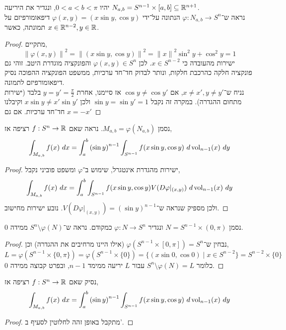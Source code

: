 \question{}
\subquestion{}
יהיו $0 < a < b < \pi$,
ונגדיר את היריעה $N_{a, b} = S^{n - 1} \times [a, b] \subseteq \mathbb{R}^{n + 1}$. \\
נראה ש־$\varphi : N_{a, b} \to S^n$ הנתונה על־ידי $\varphi(x, y) = (x \sin y, \cos y)$ דיפאומורפיזם על תמונתה, כאשר $x \in \mathbb{R}^{n - 2}, y \in \mathbb{R}$.
\begin{proof}
	מתקיים,
	\[
		{\lVert \varphi(x, y) \rVert}^2
		= {\lVert (x \sin y, \cos y) \rVert}^2
		= {\lVert x \rVert}^2 \sin^2 y + \cos^2 y
		= 1
	\]
	ישירות מהעובדה כי $x \in S^{n - 2}$.
	לכן $\varphi(x, y) \in S^n$ והפונקציה מוגדרת היטב.
	זוהי גם פונקציה חלקה כהרכבת חלקות, ונותר לבדוק חד־חד ערכיות, ממשפט הפונקציה ההפוכה נסיק דיפאומורפיזם לתמונה. \\
	נניח ש־$x \ne x', y \ne y'$, אם $\cos y \ne \cos y'$ אז סיימנו, אחרת $y = y' = \frac{\pi}{2}$ בלבד (ישירות מתחום ההגדרה).
	במקרה זה נקבל $\sin y = \sin y' = 1$ ולכן $x \sin y \ne x' \sin y'$ וקיבלנו חד־חד ערכיות.
	אם גם $x = -x'$
\end{proof}

\subquestion{}
נסמן $M_{a, b} = \varphi(N_{a, b})$.
נראה שאם $f : S^n \to \mathbb{R}$ רציפה אז,
\[
	\int_{M_{a, b}} f(x)\ dx
	= \int_{a}^{b} {(\sin y)}^{n - 1} \int_{S^{n - 1}} f(x \sin y, \cos y)\ d\operatorname{vol}_{n - 1}(x)\ dy
\]
\begin{proof}
	ישירות מהגדרת אינטגרל, שימוש ב־$\varphi$ ומשפט פוביני נקבל,
	\[
		\int_{M_{a, b}} f(x)\ dx
		= \int_{a}^{b} \int_{S^{n - 1}} f(x \sin y, \cos y) V(D \varphi |_{(x, y)})\ d\operatorname{vol}_{n - 1}(x)\ dy
	\]
	ולכן מספיק שנראה ש־$V(D \varphi |_{(x, y)}) = {(\sin y)}^{n - 1}$.
	נובע ישירות מחישוב.
\end{proof}

\subquestion{}
נסמן $N = S^{n - 1} \times (0, \pi)$ ונגדיר $\varphi : N \to S^n$ כמקודם.
נראה ש־$S^n \setminus \varphi(N)$ ממידה 0.
\begin{proof}
	נבחין ש־$\varphi(S^{n - 1} \times [0, \pi]) = S^n$ (אילו היינו מרחיבים את ההגדרה) וכן,
	\[
		L
		= \varphi(S^{n - 1} \times \{0, \pi\})
		= \varphi(S^{n - 1} \times \{ 0 \})
		= \{ (x \sin 0, \cos 0) \mid x \in S^{n - 2} \}
		= S^{n - 2} \times \{ 0 \}
	\]
	כלומר $S^n \setminus \varphi(N) = L$ עבור $L$ יריעה ממימד $n - 1$, ובפרט קבוצה ממידה 0.
\end{proof}

\subquestion{}
נסיק שאם $f : S^n \to \mathbb{R}$ רציפה אז,
\[
	\int_{M_{a, b}} f(x)\ dx
	= \int_{a}^{b} {(\sin y)}^{n - 1} \int_{S^{n - 1}} f(x \sin y, \cos y)\ d\operatorname{vol}_{n - 1}(x)\ dy
\]
\begin{proof}
	מתקבל באופן זהה לחלוטין לסעיף ב'.
\end{proof}

